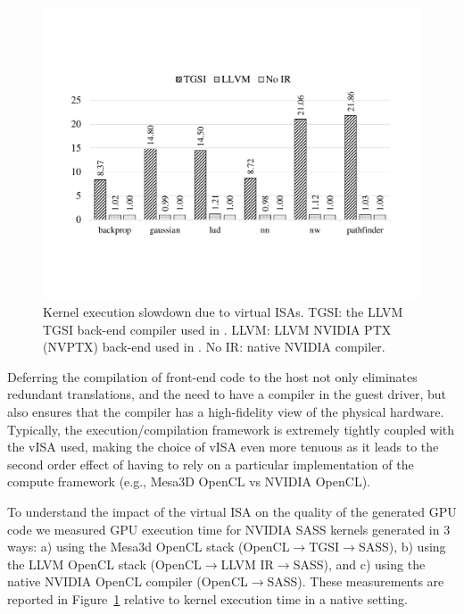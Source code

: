 \begin{figure}[!ht]
	\centering
	\includegraphics[width=.9\linewidth,trim={2cm 4.5cm 2cm 5cm},clip]{trillium/data/trillium/trillium_kernel.pdf}
	\caption{{\footnotesize Kernel execution slowdown due to virtual ISAs. TGSI: the LLVM TGSI back-end compiler used in \XenSVGA. LLVM: LLVM NVIDIA PTX (NVPTX) back-end used in \Trillium. No IR: native NVIDIA compiler.}}
	\label{fig_trillium_kernel}
\end{figure}

Deferring the compilation of front-end code to the host not only
eliminates redundant translations, and the need to have a compiler in the
guest driver,
but also ensures that the compiler has a high-fidelity view of
the physical hardware. Typically, the execution/compilation framework is
extremely tightly coupled with the vISA used, making the choice of vISA even
more tenuous as it leads to the second order effect of having to rely on a
particular implementation of the compute framework (e.g., Mesa3D OpenCL vs NVIDIA OpenCL).

To understand the impact of the virtual ISA on the quality of the generated GPU code
we measured GPU execution time for NVIDIA SASS kernels generated in 3 ways:
a) using the Mesa3d OpenCL stack (OpenCL$\rightarrow{}$TGSI$\rightarrow{}$SASS),
b) using the LLVM OpenCL stack (OpenCL$\rightarrow{}$LLVM IR$\rightarrow{}$SASS),
and c) using the native NVIDIA OpenCL compiler (OpenCL$\rightarrow{}$SASS).
These measurements are reported in Figure~\ref{fig_trillium_kernel}
relative to kernel execution time in a native setting.


